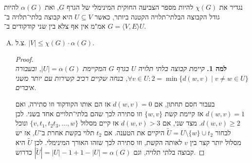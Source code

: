 \documentclass[]{article}
\newcommand\ra    {\rangle}
\newcommand\la    {\langle}
\newcommand\ag    {\alpha}
\newcommand\tl    {\tilde}
\begin{document}
	\section{}
	נגדיר את $\chi(G)$ להיות מספר הצביעה החוקית המינימלי של הגרף $G$, ואת $\alpha(G)$ להיות גודל הקבוצה הבלתי־תלויה הקטנה ביותר, כאשר $U \subseteq V$ היא קבוצה בלתי־תלויה ב־$G = \la V, E \ra$ אמ"מ אין אף צלא בין שני קודקודים ב־$U$. 
	\begin{enumerate}[(A)]
		\item צ.ל. $|V| \le \chi(G) \cdot \ag(G)$. \begin{proof} \ \\
			\textbf{למה 1. }\textit{קיימת קבוצה בלתי תלויה $U$ בגרף $G$ המקיימת $|U| = \alpha(G)$, ובעבורה $\forall v \in U\colon 2 = \min \{d(w, v) \mid v \neq w \in U\}$, בנחה שקיים רכיב קשירות עם יותר משני איברים. }
			
			בעבור חסם תחתון, אם $d(w, v) = 0$ אז הם אותו הקודקוד וזו סתירה, ואם $d(w, v) = 1$ אז קיימת קשת $\{w, v\}$ וזו סתירה לכך שהם בלתי־תלויים אחד בשני. לכן $d(w, v) \ge 2$. מצד שני, אם $d(w, v) > 3$ אז קיים מסלול $\{v, t_1, t_2 t_3, \dots, w\}$ ונוכל לבחור $\tl U = U \setminus \{w\} \cup t_2$ היקיים את הטענה. אם $t_2$ תלוי בקשת אחרת ב־$U$, אז יש מסלול יותר קצר בין $v$ לאותה הקשת, וזו סתירה לכך שזהו האורך המינימלי. לכן $\tl U$ היא קבוצה בלתי תלויה, וגם $|\tl U| = |U| - 1 + 1 - |U| = \ag(G)$ כדרוש. 
			

\end{proof}
\end{enumerate}
\end{document}
